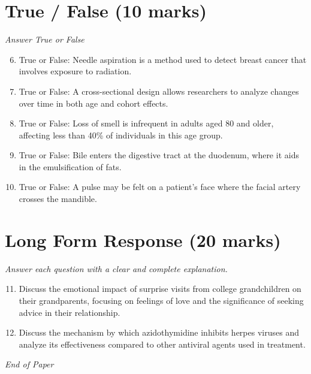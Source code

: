 \documentclass[12pt]{article}
\begin{document}
\section*{True / False (10 marks)}
\textit{Answer True or False}
\begin{enumerate}[label=\arabic*.]
\setcounter{enumi}{5}
\item True or False: Needle aspiration is a method used to detect breast cancer that involves exposure to radiation.
\item True or False: A cross-sectional design allows researchers to analyze changes over time in both age and cohort effects.
\item True or False: Loss of smell is infrequent in adults aged 80 and older, affecting less than 40\% of individuals in this age group.
\item True or False: Bile enters the digestive tract at the duodenum, where it aids in the emulsification of fats.
\item True or False: A pulse may be felt on a patient's face where the facial artery crosses the mandible.
\end{enumerate}

\section*{Long Form Response (20 marks)}
\textit{Answer each question with a clear and complete explanation.}
\begin{enumerate}[label=\arabic*.]
\setcounter{enumi}{10}
\item Discuss the emotional impact of surprise visits from college grandchildren on their grandparents, focusing on feelings of love and the significance of seeking advice in their relationship.
\item Discuss the mechanism by which azidothymidine inhibits herpes viruses and analyze its effectiveness compared to other antiviral agents used in treatment.
\end{enumerate}

\vfill
\noindent\textit{End of Paper}
\end{document}
